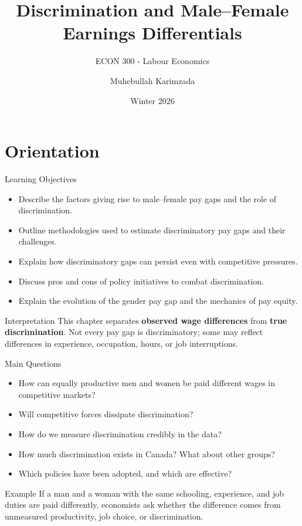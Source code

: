 \documentclass[aspectratio=169]{beamer}
\title{\textbf{Discrimination and Male--Female Earnings Differentials}}
\subtitle{{\large ECON 300 - Labour Economics}}
\author{Muhebullah Karimzada}
\date{Winter 2026}
\begin{document}
\begin{frame}[plain]
  \titlepage
\end{frame}

\section{Orientation}

\begin{frame}{Learning Objectives}
\transfade
\begin{itemize}[<+->]
  \item Describe the factors giving rise to male--female pay gaps and the role of discrimination.
  \item Outline methodologies used to estimate discriminatory pay gaps and their challenges.
  \item Explain how discriminatory gaps can persist even with competitive pressures.
  \item Discuss pros and cons of policy initiatives to combat discrimination.
  \item Explain the evolution of the gender pay gap and the mechanics of pay equity.
\end{itemize}

\begin{block}{Interpretation}
This chapter separates \textbf{observed wage differences} from \textbf{true discrimination}. Not every pay gap is discriminatory; some may reflect differences in experience, occupation, hours, or job interruptions.
\end{block}
\end{frame}

\begin{frame}{Main Questions}
\transfade
\begin{itemize}[<+->]
  \item How can equally productive men and women be paid different wages in competitive markets?
  \item Will competitive forces dissipate discrimination?
  \item How do we measure discrimination credibly in the data?
  \item How much discrimination exists in Canada? What about other groups?
  \item Which policies have been adopted, and which are effective?
\end{itemize}

\begin{exampleblock}{Example}
If a man and a woman with the same schooling, experience, and job duties are paid differently, economists ask whether the difference comes from unmeasured productivity, job choice, or discrimination.
\end{exampleblock}
\end{frame}
\end{document}
